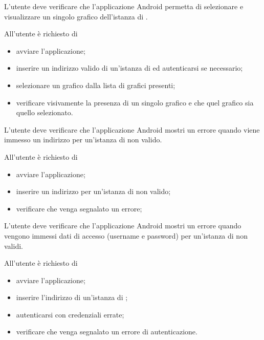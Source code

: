 	L'utente deve verificare che l'applicazione Android permetta di selezionare e visualizzare un singolo grafico dell'istanza di \projectname{}.

		All'utente è richiesto di
		\begin{itemize}
			\item avviare l'applicazione;
			\item inserire un indirizzo valido di un'istanza di \projectname{} ed autenticarsi se necessario;
			\item selezionare un grafico dalla lista di grafici presenti;
			\item verificare visivamente la presenza di un singolo grafico e che quel grafico sia quello selezionato.
		\end{itemize}

	L'utente deve verificare che l'applicazione Android mostri un errore quando viene immesso un indirizzo per un'istanza di \projectname{} non valido.

		All'utente è richiesto di
		\begin{itemize}
			\item avviare l'applicazione;
			\item inserire un indirizzo per un'istanza di \projectname{} non valido;
			\item verificare che venga segnalato un errore;
		\end{itemize}

	L'utente deve verificare che l'applicazione Android mostri un errore quando vengono immessi dati di accesso (username e password) per un'istanza di \projectname{} non validi.

		All'utente è richiesto di
		\begin{itemize}
			\item avviare l'applicazione;
			\item inserire l'indirizzo di un'istanza di \projectname{};
			\item autenticarsi con credenziali errate;
			\item verificare che venga segnalato un errore di autenticazione.
		\end{itemize}